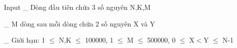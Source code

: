 Input
\_ Dòng đầu tiên chứa 3 số nguyên N,K,M  

   \_ M dòng sau mỗi dòng chứa 2 số nguyên X và Y  

   \_ Giới hạn: 1 $\le$ N,K $\le$ 100000, 1 $\le$ M $\le$ 500000, 0 $\le$ X$<$Y $\le$ N-1